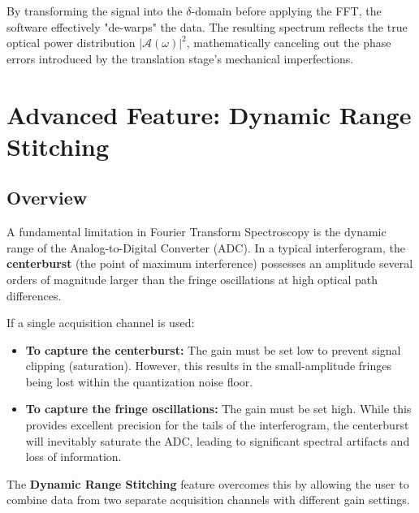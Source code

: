 \documentclass[8pt,a4paper]{article}
\begin{document}
	By transforming the signal into the $\delta$-domain before applying the FFT, the software effectively "de-warps" the data. The resulting spectrum reflects the true optical power distribution $|\mathcal{A}(\omega)|^2$, mathematically canceling out the phase errors introduced by the translation stage's mechanical imperfections.
	
	\section{Advanced Feature: Dynamic Range Stitching}
	
	\subsection{Overview}
	A fundamental limitation in Fourier Transform Spectroscopy is the dynamic range of the Analog-to-Digital Converter (ADC). In a typical interferogram, the \textbf{centerburst} (the point of maximum interference) possesses an amplitude several orders of magnitude larger than the fringe oscillations at high optical path differences.
	
	If a single acquisition channel is used:
	\begin{itemize}
		\item \textbf{To capture the centerburst:} The gain must be set low to prevent signal clipping (saturation). However, this results in the small-amplitude fringes being lost within the quantization noise floor.
		\item \textbf{To capture the fringe oscillations:} The gain must be set high. While this provides excellent precision for the tails of the interferogram, the centerburst will inevitably saturate the ADC, leading to significant spectral artifacts and loss of information.
	\end{itemize}
	The \textbf{Dynamic Range Stitching} feature overcomes this by allowing the user to combine data from two separate acquisition channels with different gain settings.
	
\end{document}
